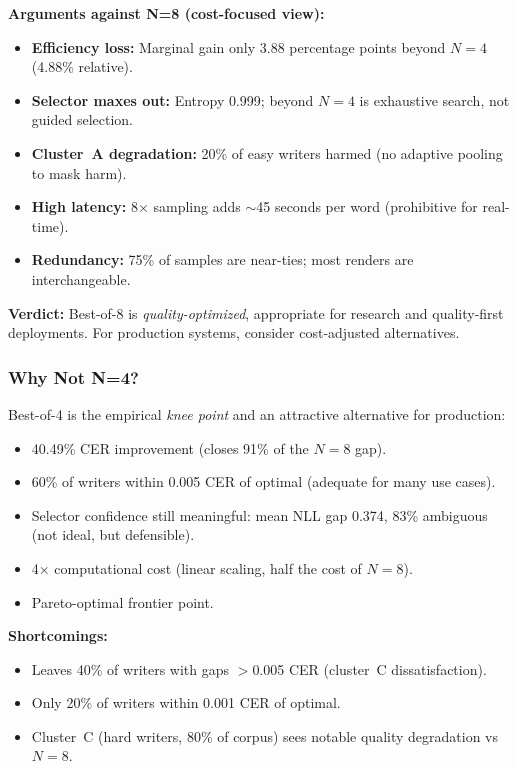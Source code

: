 \documentclass[10.5pt,a4paper]{article}
\begin{document}
\textbf{Arguments against N=8 (cost-focused view):}
\begin{itemize}
	\item[$\times$] \textbf{Efficiency loss:} Marginal gain only 3.88 percentage points beyond $N{=}4$ (4.88\% relative).
	\item[$\times$] \textbf{Selector maxes out:} Entropy 0.999; beyond $N{=}4$ is exhaustive search, not guided selection.
	\item[$\times$] \textbf{Cluster~A degradation:} 20\% of easy writers harmed (no adaptive pooling to mask harm).
	\item[$\times$] \textbf{High latency:} 8$\times$ sampling adds $\sim$45 seconds per word (prohibitive for real-time).
	\item[$\times$] \textbf{Redundancy:} 75\% of samples are near-ties; most renders are interchangeable.
\end{itemize}

\textbf{Verdict:} Best-of-8 is \emph{quality-optimized}, appropriate for research and quality-first deployments.
For production systems, consider cost-adjusted alternatives.

\subsubsection{Why Not N=4?}

Best-of-4 is the empirical \emph{knee point} and an attractive alternative for production:

\begin{itemize}
	\item[\checkmark] 40.49\% CER improvement (closes 91\% of the $N{=}8$ gap).
	\item[\checkmark] 60\% of writers within 0.005 CER of optimal (adequate for many use cases).
	\item[\checkmark] Selector confidence still meaningful: mean NLL gap 0.374, 83\% ambiguous (not ideal, but defensible).
	\item[\checkmark] 4$\times$ computational cost (linear scaling, half the cost of $N{=}8$).
	\item[\checkmark] Pareto-optimal frontier point.
\end{itemize}

\textbf{Shortcomings:}
\begin{itemize}
	\item[$\times$] Leaves 40\% of writers with gaps $>$0.005 CER (cluster~C dissatisfaction).
	\item[$\times$] Only 20\% of writers within 0.001 CER of optimal.
	\item[$\times$] Cluster~C (hard writers, 80\% of corpus) sees notable quality degradation vs $N{=}8$.
\end{itemize}
\end{document}
